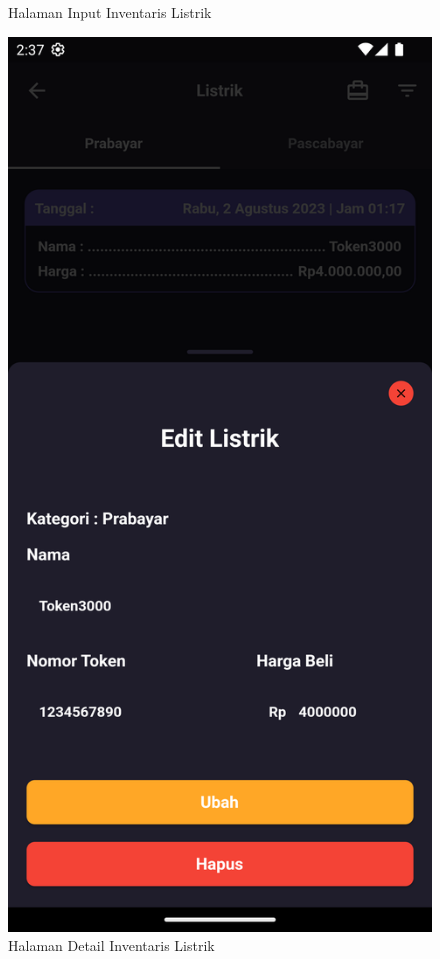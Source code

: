 \begin{spacing}{1.5}
\begin{enumerate}
\begin{enumerate}
\begin{itemize}
\begin{figure}[H]
						\caption{Halaman Input Inventaris Listrik}
					\endminipage\hfill
						\includegraphics[width=\linewidth]{gambar/sprint4/el_3.png}
						\caption{Halaman Detail Inventaris Listrik}
					\endminipage\hfill
				\end{figure}


\end{itemize}
\end{enumerate}
\end{enumerate}
\end{spacing}
